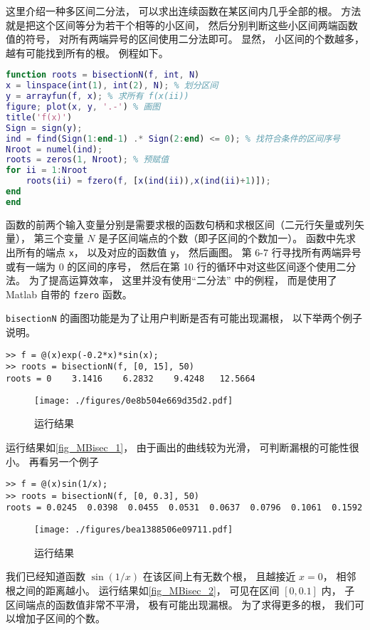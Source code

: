 

这里介绍一种多区间二分法， 可以求出连续函数在某区间内几乎全部的根。 方法就是把这个区间等分为若干个相等的小区间， 然后分别判断这些小区间两端函数值的符号， 对所有两端异号的区间使用二分法即可。 显然， 小区间的个数越多， 越有可能找到所有的根。 例程如下。

\begin{lstlisting}[language=matlab, caption=bisectionN.m]
function roots = bisectionN(f, int, N)
x = linspace(int(1), int(2), N); % 划分区间
y = arrayfun(f, x); % 求所有 f(x(ii))
figure; plot(x, y, '.-') % 画图
title('f(x)')
Sign = sign(y);
ind = find(Sign(1:end-1) .* Sign(2:end) <= 0); % 找符合条件的区间序号
Nroot = numel(ind);
roots = zeros(1, Nroot); % 预赋值
for ii = 1:Nroot
    roots(ii) = fzero(f, [x(ind(ii)),x(ind(ii)+1)]);  
end
end
\end{lstlisting}

函数的前两个输入变量分别是需要求根的函数句柄和求根区间（二元行矢量或列矢量）， 第三个变量 $N$ 是子区间端点的个数（即子区间的个数加一）。 函数中先求出所有的端点 \verb|x|， 以及对应的函数值 \verb|y|， 然后画图。 第 6-7 行寻找所有两端异号或有一端为 0 的区间的序号， 然后在第 10 行的循环中对这些区间逐个使用二分法。 为了提高运算效率， 这里并没有使用“二分法” 中的例程， 而是使用了 Matlab 自带的 \verb|fzero| 函数。

\verb|bisectionN| 的画图功能是为了让用户判断是否有可能出现漏根， 以下举两个例子说明。
\begin{lstlisting}[language=matlabC]
>> f = @(x)exp(-0.2*x)*sin(x);
>> roots = bisectionN(f, [0, 15], 50)
roots = 0    3.1416    6.2832    9.4248   12.5664
\end{lstlisting}
\begin{figure}[ht]
\centering
\texttt{[image: ./figures/0e8b504e669d35d2.pdf]}
\caption{运行结果} \label{fig_MBisec_1}
\end{figure}
运行结果如\autoref{fig_MBisec_1}， 由于画出的曲线较为光滑， 可判断漏根的可能性很小。 再看另一个例子
\begin{lstlisting}[language=matlabC]
>> f = @(x)sin(1/x);
>> roots = bisectionN(f, [0, 0.3], 50)
roots = 0.0245  0.0398  0.0455  0.0531  0.0637  0.0796  0.1061  0.1592
\end{lstlisting}
\begin{figure}[ht]
\centering
\texttt{[image: ./figures/bea1388506e09711.pdf]}
\caption{运行结果} \label{fig_MBisec_2}
\end{figure}
我们已经知道函数 $\sin(1/x)$ 在该区间上有无数个根， 且越接近 $x = 0$， 相邻根之间的距离越小。 运行结果如\autoref{fig_MBisec_2}，  可见在区间 $[0, 0.1]$ 内， 子区间端点的函数值非常不平滑， 极有可能出现漏根。 为了求得更多的根， 我们可以增加子区间的个数。
